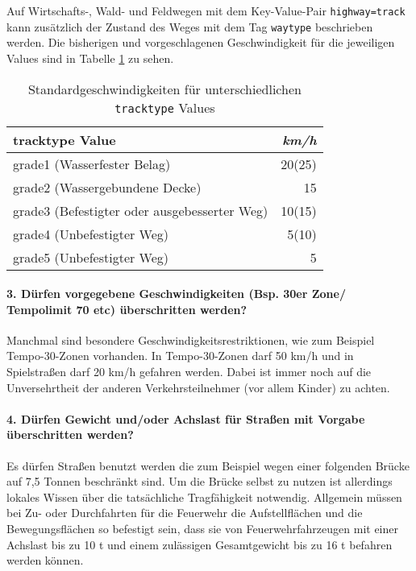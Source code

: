 Auf Wirtschafts-, Wald- und Feldwegen mit dem Key-Value-Pair \texttt{highway=track} kann zusätzlich der Zustand des Weges mit dem Tag \texttt{waytype} beschrieben werden. Die bisherigen und vorgeschlagenen Geschwindigkeit für die jeweiligen Values sind in Tabelle \ref{tab:speedinfotrack} zu sehen.

\begin{table}[h]
\centering
\caption{Standardgeschwindigkeiten für unterschiedlichen \texttt{tracktype} Values}
\label{tab:speedinfotrack}
\begin{tabular}{|l|r|}
\hline
tracktype Value & \textit{km/h} \\
\hline
grade1 (Wasserfester Belag) & 20(25)   \\
grade2 (Wassergebundene Decke) & 15  \\
grade3 (Befestigter oder ausgebesserter Weg) & 10(15)  \\
grade4 (Unbefestigter Weg) & 5(10)   \\
grade5 (Unbefestigter Weg) & 5   \\
\hline
\end{tabular}
\end{table}

\paragraph*{3. Dürfen vorgegebene Geschwindigkeiten (Bsp. 30er Zone/ Tempolimit 70 etc) überschritten werden?}
\label{frage3}
Manchmal sind besondere Geschwindigkeitsrestriktionen, wie zum Beispiel Tempo-30-Zonen vorhanden. In Tempo-30-Zonen darf 50 km/h und in Spielstraßen darf 20 km/h gefahren werden. Dabei ist immer noch auf die Unversehrtheit der anderen Verkehrsteilnehmer (vor allem Kinder) zu achten.

\paragraph*{4. Dürfen Gewicht und/oder Achslast für Straßen mit Vorgabe überschritten werden?}
\label{frage4}

Es dürfen Straßen benutzt werden die zum Beispiel wegen einer folgenden Brücke auf 7,5 Tonnen beschränkt sind. Um die Brücke selbst zu nutzen ist allerdings lokales Wissen über die tatsächliche Tragfähigkeit notwendig. 
Allgemein müssen bei Zu- oder Durchfahrten für die Feuerwehr die Aufstellflächen und die Bewegungsflächen so befestigt sein, dass sie von Feuerwehrfahrzeugen mit einer Achslast bis zu 10 t und einem zulässigen Gesamtgewicht bis zu 16 t befahren werden können.


